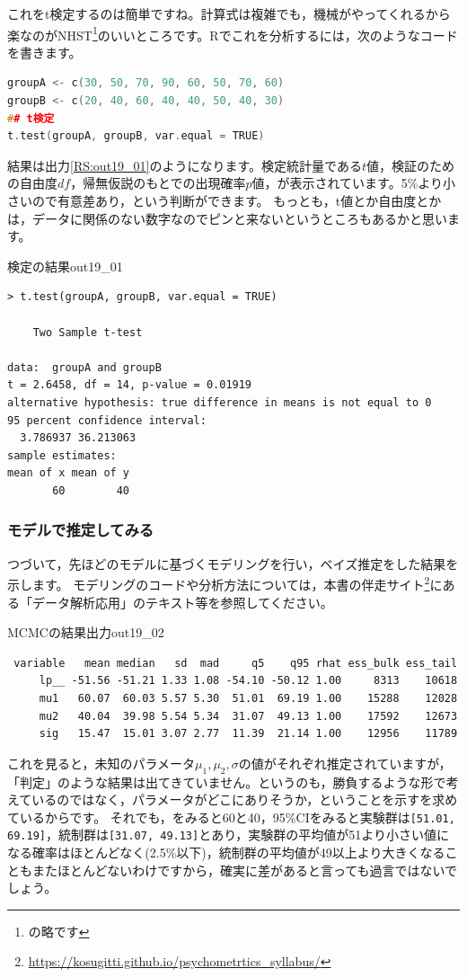 \documentclass{ltjsbook}
\begin{document}
これをt検定するのは簡単ですね。計算式は複雑でも，機械がやってくれるから楽なのがNHST\footnote{の略です}のいいところです。Rでこれを分析するには，次のようなコードを書きます。
\begin{lstlisting}[language=c++,label={code:19_03},caption={帰無仮説検定のコード}]
groupA <- c(30, 50, 70, 90, 60, 50, 70, 60)
groupB <- c(20, 40, 60, 40, 40, 50, 40, 30)
## t検定
t.test(groupA, groupB, var.equal = TRUE)
\end{lstlisting}

結果は出力\ref{RS:out19_01}のようになります。検定統計量である$t$値，検証のための自由度$df$，帰無仮説のもとでの出現確率$p$値，が表示されています。5\%より小さいので有意差あり，という判断ができます。
もっとも，t値とか自由度とかは，データに関係のない数字なのでピンと来ないというところもあるかと思います。
\begin{Rscreen}{検定の結果}{out19_01}
    \begin{verbatim}
> t.test(groupA, groupB, var.equal = TRUE)

	Two Sample t-test

data:  groupA and groupB
t = 2.6458, df = 14, p-value = 0.01919
alternative hypothesis: true difference in means is not equal to 0
95 percent confidence interval:
  3.786937 36.213063
sample estimates:
mean of x mean of y 
       60        40 
\end{verbatim}
\end{Rscreen}

\subsubsection{モデルで推定してみる}
つづいて，先ほどのモデルに基づくモデリングを行い，ベイズ推定をした結果を示します。
モデリングのコードや分析方法については，本書の伴走サイト\footnote{\url{https://kosugitti.github.io/psychometrtics_syllabus/}}にある「データ解析応用」のテキスト等を参照してください。
\begin{SCcmd}{MCMCの結果出力}{out19_02}
    \begin{verbatim}
 variable   mean median   sd  mad     q5    q95 rhat ess_bulk ess_tail
     lp__ -51.56 -51.21 1.33 1.08 -54.10 -50.12 1.00     8313    10618
     mu1   60.07  60.03 5.57 5.30  51.01  69.19 1.00    15288    12028
     mu2   40.04  39.98 5.54 5.34  31.07  49.13 1.00    17592    12673
     sig   15.47  15.01 3.07 2.77  11.39  21.14 1.00    12956    11789    
\end{verbatim}
\end{SCcmd}
これを見ると，未知のパラメータ$\mu_1, \mu_2, \sigma$の値がそれぞれ推定されていますが，「判定」のような結果は出てきていません。というのも，勝負するような形で考えているのではなく，パラメータがどこにありそうか，ということを示すを求めているからです。
それでも，をみると60と40，95\%CIをみると実験群は\verb|[51.01, 69.19]|，統制群は\verb|[31.07, 49.13]|とあり，実験群の平均値が51より小さい値になる確率はほとんどなく(2.5\%以下)，統制群の平均値が49以上より大きくなることもまたほとんどないわけですから，確実に差があると言っても過言ではないでしょう。
\end{document}

